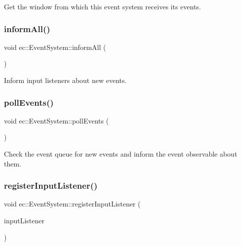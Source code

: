 Get the window from which this event system receives its events. 

\mbox{\label{classec_1_1_event_system_a45e41343c01e736a818c642696140632}} 
\subsubsection{\texorpdfstring{inform\+All()}{informAll()}}
{\footnotesize\ttfamily void ec\+::\+Event\+System\+::inform\+All (\begin{DoxyParamCaption}{ }\end{DoxyParamCaption})}



Inform input listeners about new events. 

\mbox{\label{classec_1_1_event_system_a547dbafa5aa6f770c8a839d81a369ea6}} 
\subsubsection{\texorpdfstring{poll\+Events()}{pollEvents()}}
{\footnotesize\ttfamily void ec\+::\+Event\+System\+::poll\+Events (\begin{DoxyParamCaption}{ }\end{DoxyParamCaption})}



Check the event queue for new events and inform the event observable about them. 

\mbox{\label{classec_1_1_event_system_a179422c96238019204eccd00f8662c01}} 
\subsubsection{\texorpdfstring{register\+Input\+Listener()}{registerInputListener()}}
{\footnotesize\ttfamily void ec\+::\+Event\+System\+::register\+Input\+Listener (\begin{DoxyParamCaption}\item[{\mbox{\hyperlink{classec_1_1_input_listener}{Input\+Listener}} $\ast$}]{input\+Listener }\end{DoxyParamCaption})}




